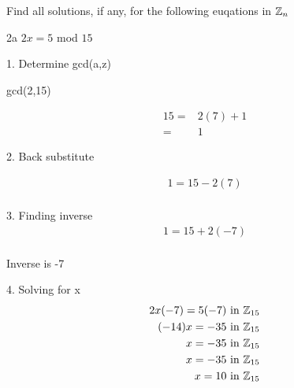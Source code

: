 \begin{question}{2}
Find all solutions, if any, for the following euqations in $\mathbb{Z}_n$
\end{question}




%
%



\begin{question}{2a}
$2x = 5$ mod $15$

1. Determine gcd(a,z)

gcd(2,15)

\begin{align*}
15 =& 2(7) + 1 \\
=& 1
\end{align*}

2. Back substitute

\begin{align*}
1 = 15 - 2(7)\\
\end{align*}

3. Finding inverse
\begin{align*}
1 = 15 + 2(-7)\\
\end{align*} 

Inverse is -7

4. Solving for x
\begin{align*}
2x(-7) = 5(-7) \textrm{ in } \mathbb{Z}_{15}\\
(-14)x = -35 \textrm{ in } \mathbb{Z}_{15}\\
x = -35 \textrm{ in } \mathbb{Z}_{15}\\
x = -35 \textrm{ in } \mathbb{Z}_{15}\\
x = 10 \textrm{ in } \mathbb{Z}_{15}\\
\end{align*}
\end{question}

